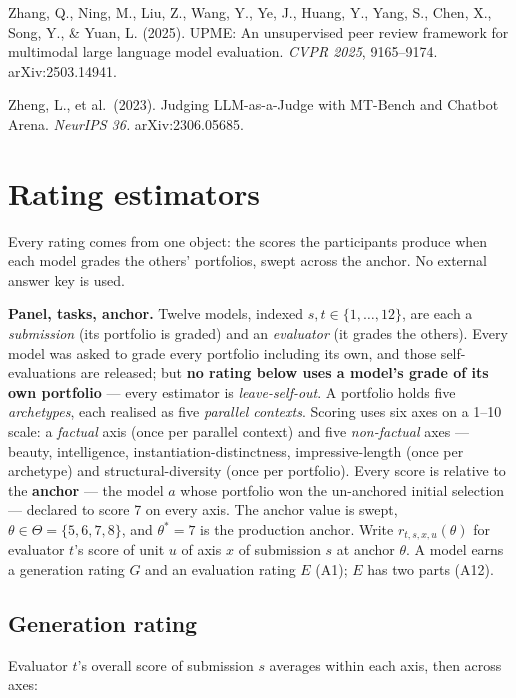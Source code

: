 \documentclass{article}
\begin{document}
Zhang, Q., Ning, M., Liu, Z., Wang, Y., Ye, J., Huang, Y., Yang, S., Chen, X., Song, Y., \& Yuan, L. (2025). UPME: An unsupervised peer review framework for multimodal large language model evaluation. \emph{CVPR 2025}, 9165--9174. arXiv:2503.14941.

Zheng, L., et al.~(2023). Judging LLM-as-a-Judge with MT-Bench and Chatbot Arena. \emph{NeurIPS 36.} arXiv:2306.05685.

\endgroup
\clearpage
\appendix

\section{Rating estimators}\label{rating-estimators}

Every rating comes from one object: the scores the participants produce when each model grades the others' portfolios, swept across the anchor. No external answer key is used.

\textbf{Panel, tasks, anchor.} Twelve models, indexed \(s,t\in\{1,\dots,12\}\), are each a \emph{submission} (its portfolio is graded) and an \emph{evaluator} (it grades the others). Every model was asked to grade every portfolio including its own, and those self-evaluations are released; but \textbf{no rating below uses a model's grade of its own portfolio} --- every estimator is \emph{leave-self-out}. A portfolio holds five \emph{archetypes}, each realised as five \emph{parallel contexts}. Scoring uses six axes on a 1--10 scale: a \emph{factual} axis (once per parallel context) and five \emph{non-factual} axes --- beauty, intelligence, instantiation-distinctness, impressive-length (once per archetype) and structural-diversity (once per portfolio). Every score is relative to the \textbf{anchor} --- the model \(a\) whose portfolio won the un-anchored initial selection --- declared to score 7 on every axis. The anchor value is swept, \(\theta\in\Theta=\{5,6,7,8\}\), and \(\theta^{*}=7\) is the production anchor. Write \(r_{t,s,x,u}(\theta)\) for evaluator \(t\)'s score of unit \(u\) of axis \(x\) of submission \(s\) at anchor \(\theta\). A model earns a generation rating \(G\) and an evaluation rating \(E\) (A1); \(E\) has two parts (A12).

\subsection{Generation rating}\label{generation-rating}

Evaluator \(t\)'s overall score of submission \(s\) averages within each axis, then across axes:
\end{document}
